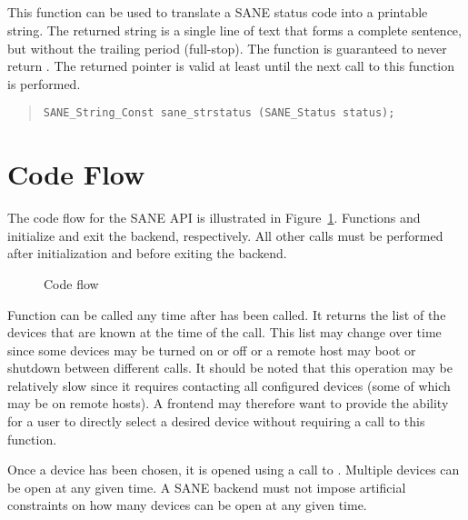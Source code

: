 \documentclass[11pt,DVIps]{report}
\begin{document}
\subsection{}

This function can be used to translate a SANE status code into a
printable string.  The returned string is a single line of text that
forms a complete sentence, but without the trailing period
(full-stop).  The function is guaranteed to never return .
The returned pointer is valid at least until the next call to this
function is performed.
\begin{quote}
\begin{verbatim}
SANE_String_Const sane_strstatus (SANE_Status status);
\end{verbatim}
\end{quote}

\section{Code Flow}

The code flow for the SANE API is illustrated in
Figure~\ref{fig:flow}.  Functions  and
 initialize and exit the backend, respectively.
All other calls must be performed after initialization and before
exiting the backend.

\begin{figure}[htb]
  \begin{center}
    \leavevmode
    \caption{Code flow}
    \label{fig:flow}
  \end{center}
\end{figure}

Function  can be called any time after
 has been called.  It returns the list of the
devices that are known at the time of the call.  This list may change
over time since some devices may be turned on or off or a remote host
may boot or shutdown between different calls.  It should be noted that
this operation may be relatively slow since it requires contacting all
configured devices (some of which may be on remote hosts).  A frontend
may therefore want to provide the ability for a user to directly
select a desired device without requiring a call to this function.

Once a device has been chosen, it is opened using a call to
.  Multiple devices can be open at any given time.
A SANE backend must not impose artificial constraints on how many
devices can be open at any given time.
\end{document}
